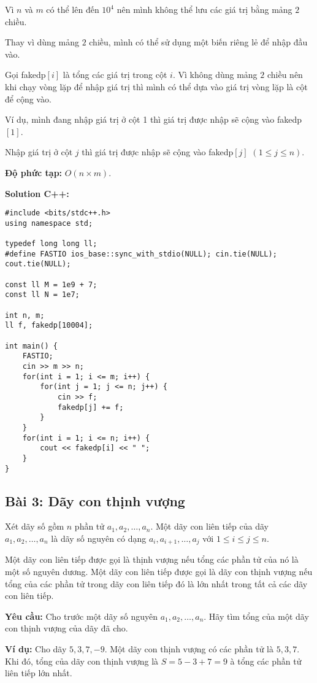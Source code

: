 \documentclass[12pt]{scrartcl}  %
\begin{document}
Vì $n$ và $m$ có thể lên đến $10^4$ nên mình không thể lưu các giá trị bằng mảng $2$ chiều.

Thay vì dùng mảng $2$ chiều, mình có thể sử dụng một biến riêng lẻ để nhập đầu vào.

Gọi fakedp$[i]$ là tổng các giá trị trong cột $i$. Vì không dùng mảng $2$ chiều nên khi chạy vòng lặp
để nhập giá trị thì mình có thể dựa vào giá trị vòng lặp là cột để cộng vào.

Ví dụ, mình đang nhập giá trị ở cột 1 thì giá trị được nhập sẽ cộng vào fakedp$[1]$.

Nhập giá trị ở cột $j$ thì giá trị được nhập sẽ cộng vào fakedp$[j]$ $(1 \leq j \leq n)$.

\textbf{Độ phức tạp:} $O(n \times m)$.

\textbf{Solution C++:}
\begin{lstlisting}
#include <bits/stdc++.h>
using namespace std;

typedef long long ll;
#define FASTIO ios_base::sync_with_stdio(NULL); cin.tie(NULL); cout.tie(NULL);

const ll M = 1e9 + 7;
const ll N = 1e7;

int n, m;
ll f, fakedp[10004];

int main() {
    FASTIO;
    cin >> m >> n;
    for(int i = 1; i <= m; i++) {
        for(int j = 1; j <= n; j++) {
            cin >> f;
            fakedp[j] += f;
        }
    }
    for(int i = 1; i <= n; i++) {
        cout << fakedp[i] << " ";
    }
}

\end{lstlisting}

\subsection{Bài 3: Dãy con thịnh vượng}
Xét dãy số gồm $n$ phần tử $a_1, a_2, \ldots, a_n$. Một dãy con liên tiếp của dãy $a_1, a_2, \ldots, a_n$ là dãy số nguyên có dạng $a_i, a_{i+1}, \ldots, a_j$ với $1 \leq i \leq j \leq n$.

Một dãy con liên tiếp được gọi là thịnh vượng nếu tổng các phần tử của nó là một số nguyên dương. Một dãy con liên tiếp được gọi là dãy con thịnh vượng nếu tổng của các phần tử trong dãy con liên tiếp đó là lớn nhất trong tất cả các dãy con liên tiếp.

\textbf{Yêu cầu:}
Cho trước một dãy số nguyên $a_1, a_2, \ldots, a_n$. Hãy tìm tổng của một dãy con thịnh vượng của dãy đã cho. 

\textbf{Ví dụ:} Cho dãy $5, 3, 7, -9$. Một dãy con thịnh vượng có các phần tử là $5, 3, 7$. Khi đó, tổng của dãy con thịnh vượng là $S = 5 - 3 + 7 = 9$ à tổng các phần tử liên tiếp lớn nhất. 
\end{document}
